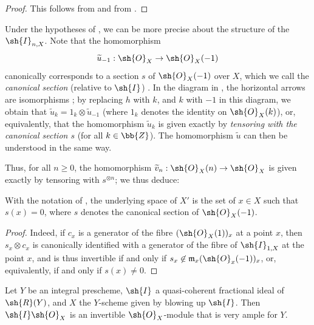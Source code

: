 \begin{proof}
This follows from  and from .
\end{proof}

\begin{env}[8.1.9]
\label{II.8.1.9}
Under the hypotheses of , we can be more precise about the structure of the $\sh{I}_{n,X}$.
Note that the homomorphism
\[
  \widetilde{u}_{-1}: \sh{O}_X \to \sh{O}_X(-1)
\]
canonically corresponds to a section $s$ of $\sh{O}_X(-1)$ over $X$, which we call the \emph{canonical section} (relative to $\sh{I}$) .
In the diagram in , the horizontal arrows are isomorphisms ; by replacing $h$ with $k$, and $k$ with $-1$ in this diagram, we obtain that $\widetilde{u}_k = 1_k \otimes \widetilde{u}_{-1}$ (where $1_k$ denotes the identity on $\sh{O}_X(k)$), or, equivalently, that the homomorphism $\widetilde{u}_k$ is given exactly by \emph{tensoring with the canonical section $s$} (for all $k\in\bb{Z}$).
The homomorphism $\widetilde{u}$  can then be understood in the same way.

Thus, for all $n\geq0$, the homomorphism $\widetilde{v}_n: \sh{O}_X(n)\to\sh{O}_X$ is given exactly by tensoring with $s^{\otimes n}$;
we thus deduce:
\end{env}

\begin{corollary}[8.1.10]
\label{II.8.1.10}
With the notation of , the underlying space of $X'$ is the set of $x\in X$ such that $s(x)=0$, where $s$ denotes the canonical section of $\sh{O}_X(-1)$.
\end{corollary}

\begin{proof}
Indeed, if $c_x$ is a generator of the fibre $(\sh{O}_X(1))_x$ at a point $x$, then $s_x\otimes c_x$ is canonically identified with a generator of the fibre of $\sh{I}_{1,X}$ at the point $x$, and is thus invertible if and only if $s_x\not\in\mathfrak{m}_x(\sh{O}_x(-1))_x$, or, equivalently, if and only if $s(x)\neq0$.
\end{proof}

\begin{proposition}
\label{II.8.1.11}
Let $Y$ be an integral prescheme, $\sh{I}$ a quasi-coherent fractional ideal of $\sh{R}(Y)$, and $X$ the $Y$-scheme given by blowing up $\sh{I}$.
Then $\sh{I}\sh{O}_X$ is an invertible $\sh{O}_X$-module that is very ample for $Y$.
\end{proposition}

